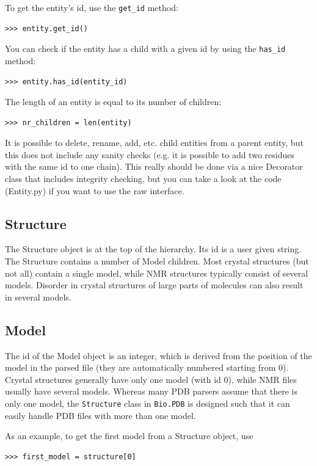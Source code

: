 \documentclass{report}
\begin{document}
To get the entity's id, use the \verb+get_id+ method:
\begin{verbatim}
>>> entity.get_id()
\end{verbatim}
You can check if the entity has a child with a given id by using the \verb+has_id+ method:
\begin{verbatim}
>>> entity.has_id(entity_id)
\end{verbatim}
The length of an entity is equal to its number of children:
\begin{verbatim}
>>> nr_children = len(entity)
\end{verbatim}

It is possible to delete, rename, add, etc. child entities from a parent entity,
but this does not include any sanity checks (e.g. it is possible to add two
residues with the same id to one chain). This really should be done via a nice
Decorator class that includes integrity checking, but you can take a look at
the code (Entity.py) if you want to use the raw interface.

\subsection{Structure}

The Structure object is at the top of the hierarchy. Its id is a user given
string. The Structure contains a number of Model children. Most crystal structures
(but not all) contain a single model, while NMR structures typically consist
of several models. Disorder in crystal structures of large parts of molecules
can also result in several models.

\subsection{Model}

The id of the Model object is an integer, which is derived from the position
of the model in the parsed file (they are automatically numbered starting from
0).
Crystal structures generally have only one model (with id 0), while NMR files usually have several models. Whereas many PDB parsers assume that there is only one model, the \verb+Structure+ class in \verb+Bio.PDB+ is designed such that it can easily handle PDB files with more than one model.

As an example, to get the first model from a Structure object, use
\begin{verbatim}
>>> first_model = structure[0]
\end{verbatim}
\end{document}
